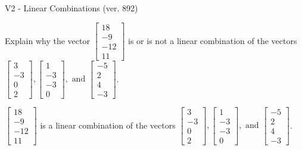 \begin{exercise}
  \begin{exerciseTitle}V2 - Linear Combinations (ver. 892)\end{exerciseTitle}
  \begin{exerciseStatement}
    Explain why the vector \(\left[\begin{array}{c}
18 \\
-9 \\
-12 \\
11
\end{array}\right]\)  is or is not a linear 
	combination of the vectors \(\left[\begin{array}{c}
3 \\
-3 \\
0 \\
2
\end{array}\right] , \left[\begin{array}{c}
1 \\
-3 \\
-3 \\
0
\end{array}\right] , \text{ and } \left[\begin{array}{c}
-5 \\
2 \\
4 \\
-3
\end{array}\right]\).
	


  \end{exerciseStatement}
  \begin{exerciseAnswer}
   \(\left[\begin{array}{c}
18 \\
-9 \\
-12 \\
11
\end{array}\right]\) 
  	 is  
	a linear combination of the vectors \(\left[\begin{array}{c}
3 \\
-3 \\
0 \\
2
\end{array}\right] , \left[\begin{array}{c}
1 \\
-3 \\
-3 \\
0
\end{array}\right] , \text{ and } \left[\begin{array}{c}
-5 \\
2 \\
4 \\
-3
\end{array}\right]\).

	
  


  \end{exerciseAnswer}
\end{exercise}